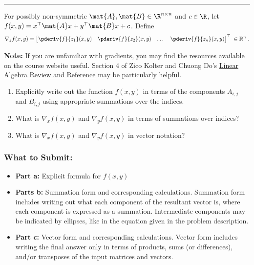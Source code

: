 \documentclass{article}
\begin{document}
\noindent\rule{\textwidth}{0.4pt}

\clearpage{}
\begin{aprob} \label{prob:sumvec}
    For possibly non-symmetric $\mat{A}, \mat{B} \in \R^{n \times n}$ and $c \in \R$, let $f(x, y) = x^\top \mat{A} x + y^\top \mat{B} x + c$. Define
    $$\nabla_z f(x,y) = \begin{bmatrix}
        \pderiv{f}{z_1}(x,y) & \pderiv{f}{z_2}(x,y) & \dots & \pderiv{f}{z_n}(x,y)
    \end{bmatrix}^\top \; \in{\mathbb R}^{n}\;.$$  

    \textbf{Note:} If you are unfamiliar with gradients, you may find the resources available on the course website useful. Section 4 of Zico Kolter and Chuong Do's \href{http://www.cs.cmu.edu/~zkolter/course/15-884/linalg-review.pdf}{Linear Algebra Review and Reference} may be particularly helpful.\\
    
    \begin{enumerate}
        \item {} Explicitly write out the function $f(x, y)$ in terms of the components $A_{i,j}$ and $B_{i,j}$ using appropriate summations over the indices.
        \item {} What is $\nabla_x f(x,y)$ and $\nabla_y f(x,y)$  in terms of summations over indices?
        \item {} What is $\nabla_x f(x,y)$ and $\nabla_y f(x,y)$ in vector notation?
    \end{enumerate}
    \subsubsection*{What to Submit:}
    \begin{itemize}
        \item \textbf{Part a:} Explicit formula for $f(x, y)$
        \item \textbf{Parts b:} Summation form and corresponding calculations. Summation form includes writing out what each component of the resultant vector is, where each component is expressed as a summation. Intermediate components may be indicated by ellipses, like in the equation given in the problem description.
        \item \textbf{Part c:} Vector form and corresponding calculations. Vector form includes writing the final answer only in terms of products, sums (or differences), and/or transposes of the input matrices and vectors.
    \end{itemize}


\end{aprob}
\end{document}
